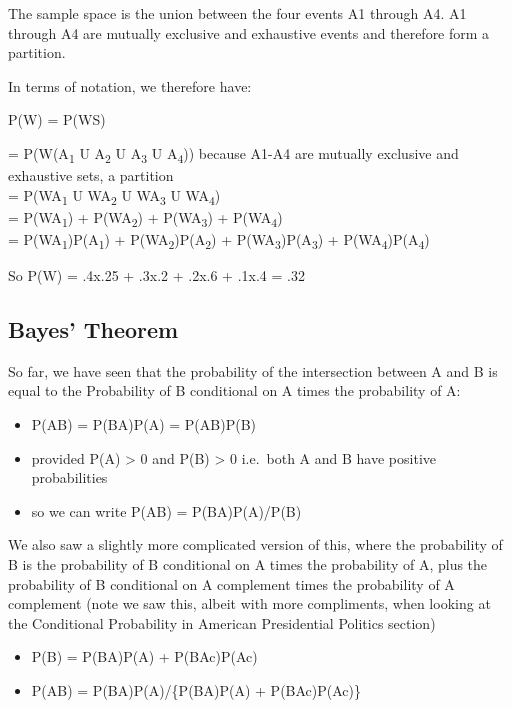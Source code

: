 \documentclass[]{book}
\providecommand{\tightlist}{%
  \setlength{\itemsep}{0pt}\setlength{\parskip}{0pt}}
\theoremstyle{definition}
\theoremstyle{definition}
\theoremstyle{definition}
\theoremstyle{remark}
\begin{document}
The sample space is the union between the four events A1 through A4. A1
through A4 are mutually exclusive and exhaustive events and therefore
form a partition.

In terms of notation, we therefore have:

P(W) = P(WS)

= P(W(A\textsubscript{1} U A\textsubscript{2} U A\textsubscript{3} U
A\textsubscript{4})) because A1-A4 are mutually exclusive and exhaustive
sets, a partition\\
= P(WA\textsubscript{1} U WA\textsubscript{2} U WA\textsubscript{3} U
WA\textsubscript{4})\\
= P(WA\textsubscript{1}) + P(WA\textsubscript{2}) +
P(WA\textsubscript{3}) + P(WA\textsubscript{4})\\
= P(W\textbar{}A\textsubscript{1})P(A\textsubscript{1}) +
P(W\textbar{}A\textsubscript{2})P(A\textsubscript{2}) +
P(W\textbar{}A\textsubscript{3})P(A\textsubscript{3}) +
P(W\textbar{}A\textsubscript{4})P(A\textsubscript{4})

So P(W) = .4x.25 + .3x.2 + .2x.6 + .1x.4 = .32

\subsection{Bayes' Theorem}\label{bayes-theorem}

So far, we have seen that the probability of the intersection between A
and B is equal to the Probability of B conditional on A times the
probability of A:

\begin{itemize}
\tightlist
\item
  P(AB) = P(B\textbar{}A)P(A) = P(A\textbar{}B)P(B)
\item
  provided P(A) \textgreater{} 0 and P(B) \textgreater{} 0 i.e.~both A
  and B have positive probabilities
\item
  so we can write P(A\textbar{}B) = P(B\textbar{}A)P(A)/P(B)
\end{itemize}

We also saw a slightly more complicated version of this, where the
probability of B is the probability of B conditional on A times the
probability of A, plus the probability of B conditional on A complement
times the probability of A complement (note we saw this, albeit with
more compliments, when looking at the Conditional Probability in
American Presidential Politics section)

\begin{itemize}
\tightlist
\item
  P(B) = P(B\textbar{}A)P(A) + P(B\textbar{}Ac)P(Ac)
\item
  P(A\textbar{}B) = P(B\textbar{}A)P(A)/\{P(B\textbar{}A)P(A) +
  P(B\textbar{}Ac)P(Ac)\}
\end{itemize}
\end{document}
